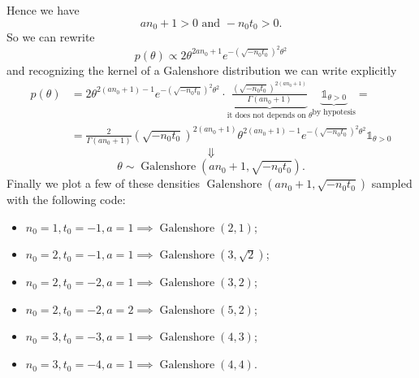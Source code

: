\documentclass[
  11pt,
]{article}
\providecommand{\tightlist}{%
  \setlength{\itemsep}{0pt}\setlength{\parskip}{0pt}}
\begin{document}
Hence we have \[an_0 + 1 > 0 \text{ and } -n_0t_0 > 0.\] \vspace{0.5cm}
So we can rewrite
\[p(\theta) \propto 2 \theta^{2an_0 + 1} e^{- \left(\sqrt{-n_0t_0}\right)^2 \theta^2}\]
and recognizing the kernel of a Galenshore distribution we can write
explicitly \begin{align*}
    p(\theta) & = 2 \theta^{2(an_0 + 1) - 1} e^{- \left(\sqrt{-n_0t_0}\right)^2 \theta^2} \cdot \underbrace{\frac{\left(\sqrt{-n_0t_0}\right)^{2(an_0 + 1)}}{\Gamma(an_0 + 1)}}_{\text{it does not depends on $\theta$}} \underbrace{\mathds{1}_{\theta > 0}}_{\text{by hypotesis}} = \\
    & = \frac{2}{\Gamma(an_0 + 1)} \left(\sqrt{-n_0t_0}\right)^{2(an_0 + 1)} \theta^{2(an_0 + 1) - 1} e^{- \left(\sqrt{-n_0t_0}\right)^2 \theta^2} \mathds{1}_{\theta > 0}
\end{align*} \[\Downarrow\]
\[\theta \sim \operatorname{Galenshore}\left(an_0 + 1, \sqrt{-n_0t_0}\right).\]
Finally we plot a few of these densities
\(\operatorname{Galenshore}\left(an_0 + 1, \sqrt{-n_0t_0}\right)\)
sampled with the following code:

\begin{itemize}
\tightlist
\item
  \(n_0 = 1, t_0 = -1, a = 1 \implies \operatorname{Galenshore}\left(2, 1\right)\);
\item
  \(n_0 = 2, t_0 = -1, a = 1 \implies \operatorname{Galenshore}\left(3, \sqrt{2}\right)\);
\item
  \(n_0 = 2, t_0 = -2, a = 1 \implies \operatorname{Galenshore}\left(3, 2\right)\);
\item
  \(n_0 = 2, t_0 = -2, a = 2 \implies \operatorname{Galenshore}\left(5, 2\right)\);
\item
  \(n_0 = 3, t_0 = -3, a = 1 \implies \operatorname{Galenshore}\left(4, 3\right)\);
\item
  \(n_0 = 3, t_0 = -4, a = 1 \implies \operatorname{Galenshore}\left(4, 4\right)\).
\end{itemize}

\vspace{0.5cm}

\scriptsize
\end{document}
